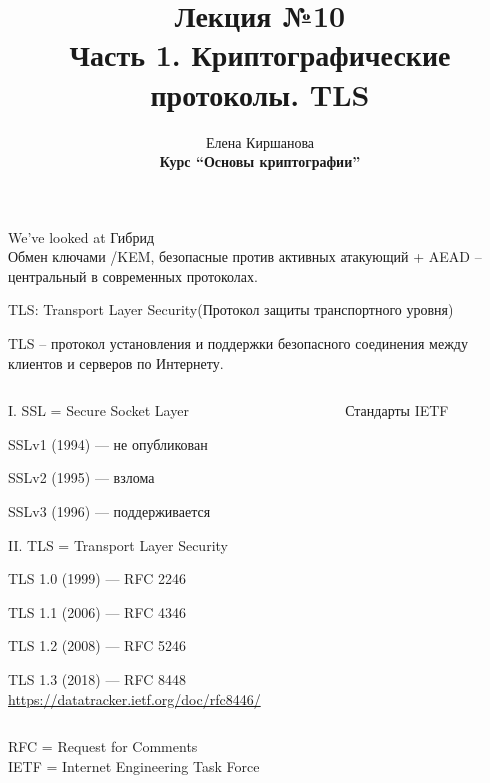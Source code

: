 \documentclass[usenames,dvipsnames,8pt,aspectratio=169]{beamer}
\title{Лекция №10 \\[10pt]
	Часть 1. Криптографические протоколы. TLS}
\date{ Елена Киршанова \\  \textbf{Курс ``Основы криптографии''} \\  }
\begin{document}
	
\begin{frame}
	\titlepage
\end{frame}

\begin{frame}{We've looked at}
\LARGE
\centering
	Гибрид \\[10pt]
	{ \color{Orange} Обмен ключами /KEM, безопасные против активных атакующий + AEAD --}  \\[10pt]
	центральный в современных протоколах.

\end{frame}



\begin{frame}{TLS: Transport Layer Security(Протокол защиты транспортного уровня)}

\Large
{\color{Orange}TLS -- } протокол установления и поддержки безопасного соединения между клиентов и серверов по Интернету. 
\vspace{10pt}
\begin{columns}
	\begin{column}{0.6\textwidth}
		I. SSL = Secure Socket Layer   \\[10pt]
		\begin{itemize}
			{\large
			\item SSLv1 (1994) — не опубликован 
			\item SSLv2 (1995) — взлома
			\item SSLv3 (1996) — поддерживается
			}
		\end{itemize}
	\vspace{10pt}
	II. TLS = Transport Layer Security  \\[10pt]
	\begin{itemize}
		{\large
		\item TLS 1.0 (1999) — RFC 2246
		\item TLS 1.1 (2006) — RFC 4346
		\item TLS 1.2 (2008) — RFC 5246
		\item TLS 1.3 (2018) — RFC 8448 \\
		\url{https://datatracker.ietf.org/doc/rfc8446/}
		
	}
	\end{itemize}
	\end{column}

	\begin{column}{0.35\textwidth}
	
		\vspace{75pt}
		
		{
			\huge
			{\color{Orange} Стандарты IETF }
		}
	\end{column}
\end{columns}

\vfill
\small
RFC = Request for Comments\\
IETF = Internet Engineering Task Force

\end{frame}
\end{document}

